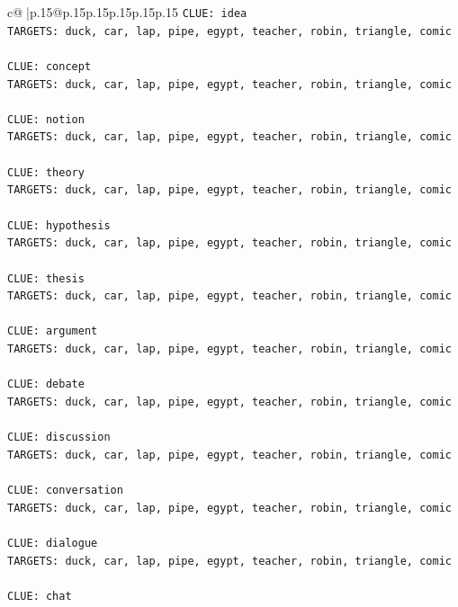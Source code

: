 \documentclass{article}
\begin{document}
{\begin{supertabular}{c@{$\;$}|p{.15\linewidth}@{}p{.15\linewidth}p{.15\linewidth}p{.15\linewidth}p{.15\linewidth}p{.15\linewidth}}
{{{\texttt{CLUE: idea} \\
\texttt{TARGETS: duck, car, lap, pipe, egypt, teacher, robin, triangle, comic} \\
\\ 
\texttt{CLUE: concept} \\
\texttt{TARGETS: duck, car, lap, pipe, egypt, teacher, robin, triangle, comic} \\
\\ 
\texttt{CLUE: notion} \\
\texttt{TARGETS: duck, car, lap, pipe, egypt, teacher, robin, triangle, comic} \\
\\ 
\texttt{CLUE: theory} \\
\texttt{TARGETS: duck, car, lap, pipe, egypt, teacher, robin, triangle, comic} \\
\\ 
\texttt{CLUE: hypothesis} \\
\texttt{TARGETS: duck, car, lap, pipe, egypt, teacher, robin, triangle, comic} \\
\\ 
\texttt{CLUE: thesis} \\
\texttt{TARGETS: duck, car, lap, pipe, egypt, teacher, robin, triangle, comic} \\
\\ 
\texttt{CLUE: argument} \\
\texttt{TARGETS: duck, car, lap, pipe, egypt, teacher, robin, triangle, comic} \\
\\ 
\texttt{CLUE: debate} \\
\texttt{TARGETS: duck, car, lap, pipe, egypt, teacher, robin, triangle, comic} \\
\\ 
\texttt{CLUE: discussion} \\
\texttt{TARGETS: duck, car, lap, pipe, egypt, teacher, robin, triangle, comic} \\
\\ 
\texttt{CLUE: conversation} \\
\texttt{TARGETS: duck, car, lap, pipe, egypt, teacher, robin, triangle, comic} \\
\\ 
\texttt{CLUE: dialogue} \\
\texttt{TARGETS: duck, car, lap, pipe, egypt, teacher, robin, triangle, comic} \\
\\ 
\texttt{CLUE: chat} \\
}}}
\end{supertabular}}
\end{document}
